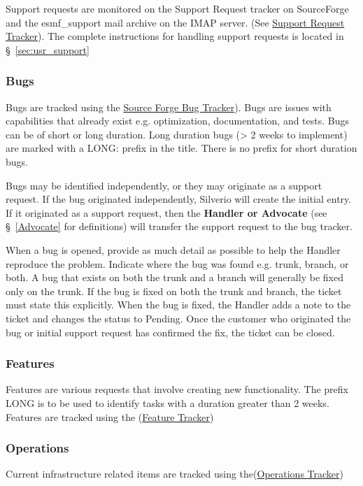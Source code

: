 {Support requests are monitored on the Support Request tracker on SourceForge and the esmf\_support mail archive on the IMAP server. (See \href{http://sourceforge.net/tracker/?group_id=38089\&atid=421186}{Support Request Tracker}). The complete instructions for handling support requests is located in  \S~\ref{sec:usr_support}

\subsubsection{Bugs}

Bugs are tracked using the \href{http://sourceforge.net/tracker/?group_id=38089\&atid=421185}{Source Forge Bug Tracker}). Bugs are issues with capabilities that already exist e.g. optimization, documentation, and tests. Bugs can be of short or long duration.  Long duration bugs (> 2 weeks to implement) are marked with a LONG: prefix in the title.  There is no prefix for short duration bugs.

Bugs may be identified independently, or they may originate as a support request. If the bug originated independently, Silverio will create the initial entry. If it originated as a support request, then the {\bf Handler or Advocate} (see \S~\ref{Advocate} for definitions) will transfer the support request to the bug tracker. 

When a bug is opened, provide as much detail as possible to help the Handler reproduce the problem. Indicate where the bug was found e.g. trunk, branch, or both. A bug that exists on both the trunk and a branch will generally be fixed only on the trunk. If the bug is fixed on both the trunk and branch, the ticket must  state this explicitly. When the bug is fixed, the Handler adds a note to the ticket and changes the status to Pending. Once the customer who originated the bug or initial support request has confirmed the fix, the ticket can be closed. 

\subsubsection{Features}

Features are various requests that involve creating new functionality. The prefix LONG is to be used to identify tasks with a duration greater than 2 weeks. Features are tracked using the 
(\href{http://sourceforge.net/tracker/?group_id=38089\&atid=421188}{Feature Tracker})

\subsubsection{Operations}
Current infrastructure related items are tracked using the(\href{http://sourceforge.net/tracker/?group_id=38089\&atid=421187}{Operations Tracker})

}
